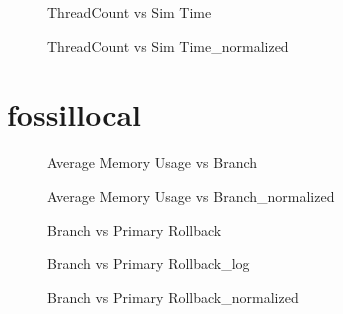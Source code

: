\vspace{1cm}
\begin{figure}[H]
\centering

\caption{ThreadCount vs Sim Time}
\end{figure}
\vspace{1cm}
\newpage
\begin{figure}[H]
\centering

\caption{ThreadCount vs Sim Time\_normalized}
\end{figure}
\vspace{1cm}
\newpage

\section{fossillocal}
\begin{figure}[H]
\centering

\caption{Average Memory Usage vs Branch}
\end{figure}
\vspace{1cm}
\begin{figure}[H]
\centering

\caption{Average Memory Usage vs Branch\_normalized}
\end{figure}
\vspace{1cm}
\newpage
\begin{figure}[H]
\centering

\caption{Branch vs Primary Rollback}
\end{figure}
\vspace{1cm}
\begin{figure}[H]
\centering

\caption{Branch vs Primary Rollback\_log}
\end{figure}
\vspace{1cm}
\newpage
\begin{figure}[H]
\centering

\caption{Branch vs Primary Rollback\_normalized}
\end{figure}
